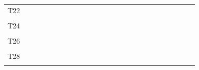 \documentclass[
]{article}
\begin{document}
\begin{longtable}[l]{lllllllllllllllllllllllll}
T22 &  &  &  &  &  &  &  &  &  &  &  &  &  &  &  &  &  &  &  &  &  &  &  & \\
\cellcolor{gray!6}{T23} & \cellcolor{gray!6}{} & \cellcolor{gray!6}{} & \cellcolor{gray!6}{} & \cellcolor{gray!6}{} & \cellcolor{gray!6}{} & \cellcolor{gray!6}{} & \cellcolor{gray!6}{} & \cellcolor{gray!6}{} & \cellcolor{gray!6}{} & \cellcolor{gray!6}{} & \cellcolor{gray!6}{} & \cellcolor{gray!6}{} & \cellcolor{gray!6}{} & \cellcolor{gray!6}{} & \cellcolor{gray!6}{} & \cellcolor{gray!6}{} & \cellcolor{gray!6}{} & \cellcolor{gray!6}{} & \cellcolor{gray!6}{} & \cellcolor{gray!6}{} & \cellcolor{gray!6}{} & \cellcolor{gray!6}{} & \cellcolor{gray!6}{} & \cellcolor{gray!6}{}\\
T24 &  &  &  &  &  &  &  &  &  &  &  &  &  &  &  &  &  &  &  &  &  &  &  & \\
\cellcolor{gray!6}{T25} & \cellcolor{gray!6}{} & \cellcolor{gray!6}{} & \cellcolor{gray!6}{} & \cellcolor{gray!6}{} & \cellcolor{gray!6}{} & \cellcolor{gray!6}{} & \cellcolor{gray!6}{} & \cellcolor{gray!6}{} & \cellcolor{gray!6}{} & \cellcolor{gray!6}{} & \cellcolor{gray!6}{} & \cellcolor{gray!6}{} & \cellcolor{gray!6}{} & \cellcolor{gray!6}{} & \cellcolor{gray!6}{} & \cellcolor{gray!6}{} & \cellcolor{gray!6}{} & \cellcolor{gray!6}{} & \cellcolor{gray!6}{} & \cellcolor{gray!6}{} & \cellcolor{gray!6}{} & \cellcolor{gray!6}{} & \cellcolor{gray!6}{} & \cellcolor{gray!6}{}\\
\addlinespace
T26 &  &  &  &  &  &  &  &  &  &  &  &  &  &  &  &  &  &  &  &  &  &  &  & \\
\cellcolor{gray!6}{T27} & \cellcolor{gray!6}{} & \cellcolor{gray!6}{} & \cellcolor{gray!6}{} & \cellcolor{gray!6}{} & \cellcolor{gray!6}{} & \cellcolor{gray!6}{} & \cellcolor{gray!6}{} & \cellcolor{gray!6}{} & \cellcolor{gray!6}{} & \cellcolor{gray!6}{} & \cellcolor{gray!6}{} & \cellcolor{gray!6}{} & \cellcolor{gray!6}{} & \cellcolor{gray!6}{} & \cellcolor{gray!6}{} & \cellcolor{gray!6}{} & \cellcolor{gray!6}{} & \cellcolor{gray!6}{} & \cellcolor{gray!6}{} & \cellcolor{gray!6}{} & \cellcolor{gray!6}{} & \cellcolor{gray!6}{} & \cellcolor{gray!6}{} & \cellcolor{gray!6}{}\\
T28 &  &  &  &  &  &  &  &  &  &  &  &  &  &  &  &  &  &  &  &  &  &  &  & \\
\cellcolor{gray!6}{T29} & \cellcolor{gray!6}{} & \cellcolor{gray!6}{} & \cellcolor{gray!6}{} & \cellcolor{gray!6}{} & \cellcolor{gray!6}{} & \cellcolor{gray!6}{} & \cellcolor{gray!6}{} & \cellcolor{gray!6}{} & \cellcolor{gray!6}{} & \cellcolor{gray!6}{} & \cellcolor{gray!6}{} & \cellcolor{gray!6}{} & \cellcolor{gray!6}{} & \cellcolor{gray!6}{} & \cellcolor{gray!6}{} & \cellcolor{gray!6}{} & \cellcolor{gray!6}{} & \cellcolor{gray!6}{} & \cellcolor{gray!6}{} & \cellcolor{gray!6}{} & \cellcolor{gray!6}{} & \cellcolor{gray!6}{} & \cellcolor{gray!6}{} & \cellcolor{gray!6}{}\\

\end{longtable}
\end{document}
